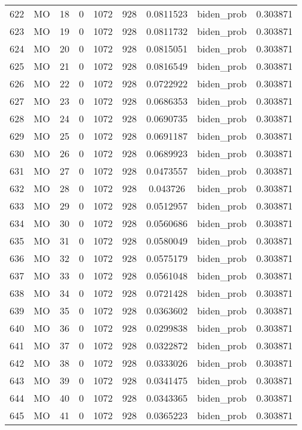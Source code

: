 \documentclass[12pt,a4paper]{article}
\begin{document}
\begin{tabular}{r|cccccccc}
	622 & MO & 18 & 0 & 1072 & 928 & 0.0811523 & biden\_prob & 0.303871 \\
	623 & MO & 19 & 0 & 1072 & 928 & 0.0811732 & biden\_prob & 0.303871 \\
	624 & MO & 20 & 0 & 1072 & 928 & 0.0815051 & biden\_prob & 0.303871 \\
	625 & MO & 21 & 0 & 1072 & 928 & 0.0816549 & biden\_prob & 0.303871 \\
	626 & MO & 22 & 0 & 1072 & 928 & 0.0722922 & biden\_prob & 0.303871 \\
	627 & MO & 23 & 0 & 1072 & 928 & 0.0686353 & biden\_prob & 0.303871 \\
	628 & MO & 24 & 0 & 1072 & 928 & 0.0690735 & biden\_prob & 0.303871 \\
	629 & MO & 25 & 0 & 1072 & 928 & 0.0691187 & biden\_prob & 0.303871 \\
	630 & MO & 26 & 0 & 1072 & 928 & 0.0689923 & biden\_prob & 0.303871 \\
	631 & MO & 27 & 0 & 1072 & 928 & 0.0473557 & biden\_prob & 0.303871 \\
	632 & MO & 28 & 0 & 1072 & 928 & 0.043726 & biden\_prob & 0.303871 \\
	633 & MO & 29 & 0 & 1072 & 928 & 0.0512957 & biden\_prob & 0.303871 \\
	634 & MO & 30 & 0 & 1072 & 928 & 0.0560686 & biden\_prob & 0.303871 \\
	635 & MO & 31 & 0 & 1072 & 928 & 0.0580049 & biden\_prob & 0.303871 \\
	636 & MO & 32 & 0 & 1072 & 928 & 0.0575179 & biden\_prob & 0.303871 \\
	637 & MO & 33 & 0 & 1072 & 928 & 0.0561048 & biden\_prob & 0.303871 \\
	638 & MO & 34 & 0 & 1072 & 928 & 0.0721428 & biden\_prob & 0.303871 \\
	639 & MO & 35 & 0 & 1072 & 928 & 0.0363602 & biden\_prob & 0.303871 \\
	640 & MO & 36 & 0 & 1072 & 928 & 0.0299838 & biden\_prob & 0.303871 \\
	641 & MO & 37 & 0 & 1072 & 928 & 0.0322872 & biden\_prob & 0.303871 \\
	642 & MO & 38 & 0 & 1072 & 928 & 0.0333026 & biden\_prob & 0.303871 \\
	643 & MO & 39 & 0 & 1072 & 928 & 0.0341475 & biden\_prob & 0.303871 \\
	644 & MO & 40 & 0 & 1072 & 928 & 0.0343365 & biden\_prob & 0.303871 \\
	645 & MO & 41 & 0 & 1072 & 928 & 0.0365223 & biden\_prob & 0.303871 \\

\end{tabular}
\end{document}
